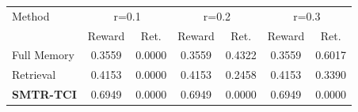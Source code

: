 \begin{tabular}{lcccccc}
\toprule
Method & \multicolumn{2}{c}{r=0.1} & \multicolumn{2}{c}{r=0.2} & \multicolumn{2}{c}{r=0.3} \\
 & Reward & Ret. & Reward & Ret. & Reward & Ret. \\
\midrule
Full Memory & 0.3559 & 0.0000 & 0.3559 & 0.4322 & 0.3559 & 0.6017 \\
Retrieval & 0.4153 & 0.0000 & 0.4153 & 0.2458 & 0.4153 & 0.3390 \\
\textbf{SMTR-TCI} & 0.6949 & 0.0000 & 0.6949 & 0.0000 & 0.6949 & 0.0000 \\
\bottomrule
\end{tabular}
